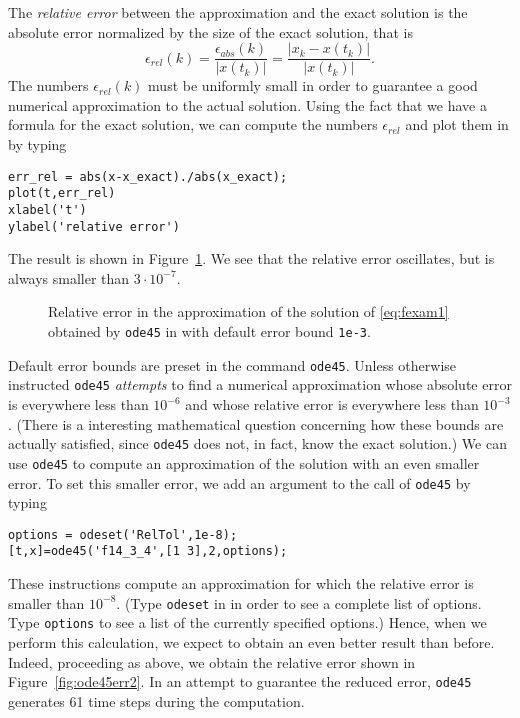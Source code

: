 \documentclass{ximera}
\begin{document}
The {\em relative error\/} between 
the approximation and the exact solution is the absolute error normalized by 
the size of the exact solution, that is  
\[
\epsilon_{rel}(k) = \frac{\epsilon_{abs}(k)}{|x(t_k)|} 
= \frac{|x_k - x(t_k)|}{|x(t_k)|}.
\]
The numbers $\epsilon_{rel}(k)$ must be uniformly small in order to guarantee
a good numerical approximation to the actual solution.  Using the fact
that we have a formula for the exact solution, we can compute the numbers 
$\epsilon_{rel}$ and plot them in \Matlab by typing
\begin{verbatim}
err_rel = abs(x-x_exact)./abs(x_exact);
plot(t,err_rel)
xlabel('t')
ylabel('relative error')
\end{verbatim} 
The result is shown in Figure~\ref{fig:ode45err1}.  We see that the relative 
error oscillates, but is always smaller than $3\cdot 10^{-7}$.
\begin{figure}[htb]
   \centerline{%
   }
   \caption{Relative error in the approximation of the solution of
   \protect\eqref{eq:fexam1} obtained by {\tt ode45} in \protect\Matlab with 
	default error bound {\tt 1e-3}.}
   \label{fig:ode45err1}
\end{figure}

Default error bounds are preset in the command {\tt ode45}.  Unless otherwise
instructed {\tt ode45} {\em attempts\/} to find a numerical approximation 
whose absolute error is everywhere less than $10^{-6}$ and whose relative 
error is everywhere less than $10^{-3}$.  (There is a interesting mathematical
question concerning how these bounds are actually satisfied, since 
{\tt ode45} does not, in fact, know the exact solution.)  We can use 
{\tt ode45} to compute an approximation of the solution with an even smaller 
error.  To set this smaller error, we add an argument to the call of 
{\tt ode45} by typing 
\begin{verbatim}
options = odeset('RelTol',1e-8);
[t,x]=ode45('f14_3_4',[1 3],2,options);
\end{verbatim}
These instructions compute an approximation for which the relative error 
 is smaller than $10^{-8}$.  
(Type {\tt odeset} in \Matlab in order to see a 
complete list of options. Type {\tt options} to see a list of the currently
specified options.)  Hence, when we perform 
this calculation, we expect to obtain an even better result than before.  
Indeed, proceeding as above, we obtain the relative error shown 
in Figure~\ref{fig:ode45err2}.  In an attempt to guarantee the reduced error, 
{\tt ode45} generates 61 time steps during the computation.  
\end{document}
